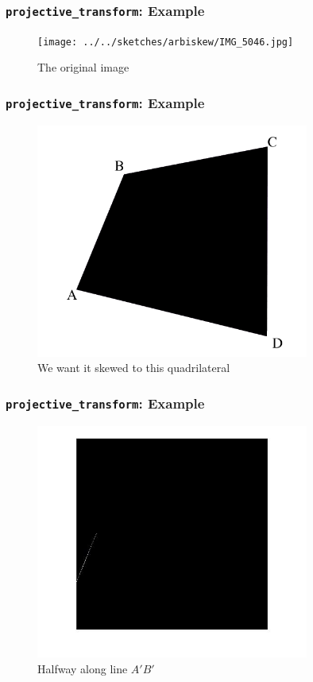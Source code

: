\documentclass{beamer}
\begin{document}
\begin{frame}
	\frametitle{{\tt projective\_transform}: Example}
	\begin{figure}
		\centering
		\texttt{[image: ../../sketches/arbiskew/IMG\_5046.jpg]}
		\caption{The original image}
	\end{figure}
\end{frame}

\begin{frame}
	\frametitle{{\tt projective\_transform}: Example}
	\begin{figure}
		\centering
		\includegraphics[width=0.8\textwidth]{skew_rectangle.png}
		\caption{We want it skewed to this quadrilateral}
	\end{figure}
\end{frame}

\begin{frame}
	\frametitle{{\tt projective\_transform}: Example}
	\begin{figure}
		\centering
		\includegraphics[width=0.8\textwidth]{projected_halfway_line.jpg}
		\caption{Halfway along line $A\prime B\prime$}
	\end{figure}
\end{frame}
\end{document}
